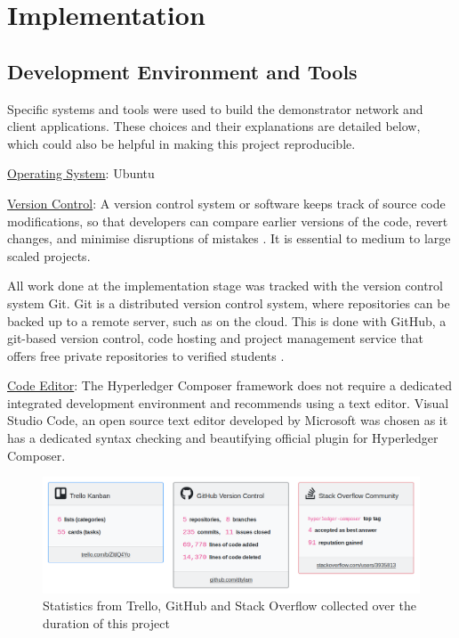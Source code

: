 \chapter{Implementation}

\graphicspath{{Chapter6/Figs/Raster/}{Chapter6/Figs/}}

\section{Development Environment and Tools}

Specific systems and tools were used to build the demonstrator network and client applications. 
These choices and their explanations are detailed below, which could also be helpful in making this project reproducible.

\underline{Operating System}: Ubuntu

\underline{Version Control}: A version control system or software keeps track of source code modifications, 
so that developers can compare earlier versions of the code, revert changes, and 
minimise disruptions of mistakes \citep{atlassian2018vcs}. It is essential to medium to large scaled projects.

All work done at the implementation stage was tracked with the version control system Git. 
Git is a distributed version control system, where repositories can be backed up to a remote server, 
such as on the cloud. This is done with GitHub, a git-based version control, code hosting and 
project management service that offers free private repositories to verified students \citep{github2018education}.

\underline{Code Editor}: The Hyperledger Composer framework does not require a dedicated integrated 
development environment and recommends using a text editor. Visual Studio Code, an open source text editor developed 
by Microsoft was chosen as it has a dedicated syntax checking and beautifying official plugin for Hyperledger Composer.

\begin{figure}[!hb] 
    \centering    
    \includegraphics[width=1.0\textwidth]{platforms_stats}
    \caption[Project Management Statistics]
        {Statistics from Trello, GitHub and Stack Overflow collected over the duration of this project} 
    \label{fig:platforms_stats}
\end{figure}

